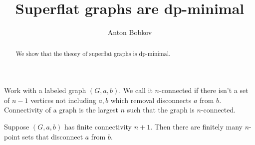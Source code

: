 \documentclass{amsart}
\begin{document}
\title{Superflat graphs are dp-minimal}
\author{Anton Bobkov}

\begin{abstract}
	We show that the theory of superflat graphs is dp-minimal.
\end{abstract}

\maketitle

Work with a labeled graph $(G, a, b)$. We call it $n$-connected if there isn't a set of $n-1$ vertices not including $a,b$ which removal disconnects $a$ from $b$. Connectivity of a graph is the largest $n$ such that the graph is $n$-connected.

\begin{Lemma}
	Suppose $(G, a, b)$ has finite connectivity $n+1$. Then there are finitely many $n$-point sets that disconnect $a$ from $b$.
\end{Lemma}
\end{document}
